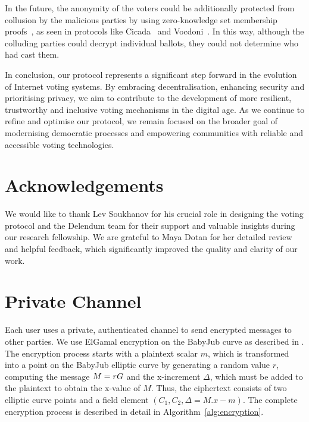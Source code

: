 \documentclass[runningheads]{llncs}
\begin{document}
In the future, the anonymity of the voters could be additionally protected from collusion by the malicious parties by using zero-knowledge set membership proofs~\cite{Semaphorea}, as seen in protocols like Cicada~\cite{BuildingCicadaPrivate} and Vocdoni~\cite{VocdoniIntroductionVocdoni}. In this way, although the colluding parties could decrypt individual ballots, they could not determine who had cast them.

In conclusion, our protocol represents a significant step forward in the evolution of Internet voting systems. By embracing decentralisation, enhancing security and prioritising privacy, we aim to contribute to the development of more resilient, trustworthy and inclusive voting mechanisms in the digital age. As we continue to refine and optimise our protocol, we remain focused on the broader goal of modernising democratic processes and empowering communities with reliable and accessible voting technologies.

\section*{Acknowledgements}
We would like to thank Lev Soukhanov for his crucial role in designing the voting protocol and the Delendum team for their support and valuable insights during our research fellowship. We are grateful to Maya Dotan for her detailed review and helpful feedback, which significantly improved the quality and clarity of our work.




\appendix

\section{Private Channel}
\label{private-channel}
Each user uses a private, authenticated channel to send encrypted messages to other parties. We use ElGamal encryption on the BabyJub curve as described in \cite{ElGamalEncryptionDecryption2020,jieWeijiekohElgamalbabyjub2023}. The encryption process starts with a plaintext scalar $m$, which is transformed into a point on the BabyJub elliptic curve by generating a random value $r$, computing the message $M=rG$ and the x-increment $\Delta$, which must be added to the plaintext to obtain the x-value of $M$. Thus, the ciphertext consists of two elliptic curve points and a field element $(C_1, C_2, \Delta=M.x - m)$. The complete encryption process is described in detail in Algorithm~\ref{alg:encryption}.
\end{document}
